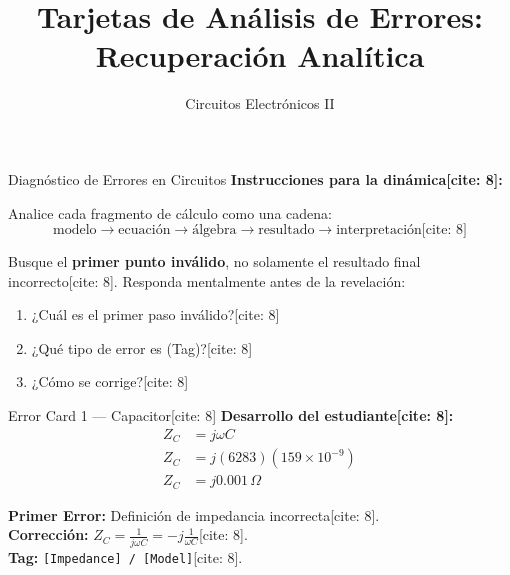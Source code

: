 \documentclass[aspectratio=169]{beamer}
\title[Tarjetas de Error]{Tarjetas de Análisis de Errores: Recuperación Analítica}
\author[IMT-221]{Circuitos Electrónicos II}
\institute{Universidad Católica Boliviana ``San Pablo'' — Sede Tarija}
\date{}
\begin{document}
\begin{frame}
    \titlepage
\end{frame}

\begin{frame}{Diagnóstico de Errores en Circuitos}
    \textbf{Instrucciones para la dinámica[cite: 8]:}
    \vspace{0.4cm}
    
    Analice cada fragmento de cálculo como una cadena:
    \begin{equation*}
        \text{modelo} \rightarrow \text{ecuación} \rightarrow \text{álgebra} \rightarrow \text{resultado} \rightarrow \text{interpretación} \text{[cite: 8]}
    \end{equation*}
    
    \vspace{0.4cm}
    Busque el \textbf{primer punto inválido}, no solamente el resultado final incorrecto[cite: 8]. Responda mentalmente antes de la revelación:
    \begin{enumerate}
        \item ¿Cuál es el primer paso inválido?[cite: 8]
        \item ¿Qué tipo de error es (Tag)?[cite: 8]
        \item ¿Cómo se corrige?[cite: 8]
    \end{enumerate}
\end{frame}

\begin{frame}{Error Card 1 — Capacitor[cite: 8]}
    \textbf{Desarrollo del estudiante[cite: 8]:}
    \begin{align*}
        Z_C &= j\omega C \\
        Z_C &= j(6283)(159 \times 10^{-9}) \\
        Z_C &= j0.001\,\Omega
    \end{align*}
    
    \vspace{0.3cm}
    \pause
    \begin{tcolorbox}[colback=red!5, colframe=red!70!black, title=\textbf{Diagnóstico}, width=\linewidth]
        \textbf{Primer Error:} Definición de impedancia incorrecta[cite: 8]. \\
        \textbf{Corrección:} $Z_C = \frac{1}{j\omega C} = -j\frac{1}{\omega C}$[cite: 8]. \\
        \textbf{Tag:} \texttt{[Impedance] / [Model]}[cite: 8].
    \end{tcolorbox}
\end{frame}
\end{document}
